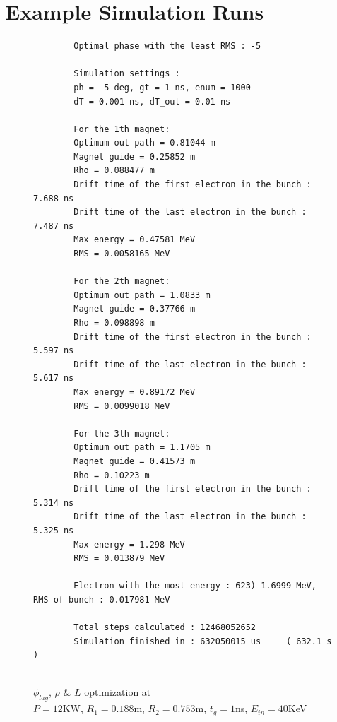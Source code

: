 \documentclass{book}
\begin{document}
\chapter{Example Simulation Runs} \label{appendix:example_simulation_runs}

\begin{figure}[H]
    \centering
    \captionsetup{justification=centering}
    \begin{verbatim}
        Optimal phase with the least RMS : -5

        Simulation settings : 
        ph = -5 deg, gt = 1 ns, enum = 1000
        dT = 0.001 ns, dT_out = 0.01 ns
        
        For the 1th magnet:
        Optimum out path = 0.81044 m
        Magnet guide = 0.25852 m
        Rho = 0.088477 m
        Drift time of the first electron in the bunch : 7.688 ns
        Drift time of the last electron in the bunch : 7.487 ns
        Max energy = 0.47581 MeV
        RMS = 0.0058165 MeV
        
        For the 2th magnet:
        Optimum out path = 1.0833 m
        Magnet guide = 0.37766 m
        Rho = 0.098898 m
        Drift time of the first electron in the bunch : 5.597 ns
        Drift time of the last electron in the bunch : 5.617 ns
        Max energy = 0.89172 MeV
        RMS = 0.0099018 MeV
        
        For the 3th magnet:
        Optimum out path = 1.1705 m
        Magnet guide = 0.41573 m
        Rho = 0.10223 m
        Drift time of the first electron in the bunch : 5.314 ns
        Drift time of the last electron in the bunch : 5.325 ns
        Max energy = 1.298 MeV
        RMS = 0.013879 MeV

        Electron with the most energy : 623) 1.6999 MeV,	RMS of bunch : 0.017981 MeV
        
        Total steps calculated : 12468052652
        Simulation finished in : 632050015 us     ( 632.1 s )
        
    \end{verbatim}
\caption{$\phi_{lag}$, $\rho$ \& $L$ optimization at \\$P=12$KW, $R_1=0.188$m, $R_2=0.753$m, $t_g=1$ns, $E_{in}=40$KeV}
\label{fig:lout_opt_1ns_Erms}
\end{figure}
\end{document}

